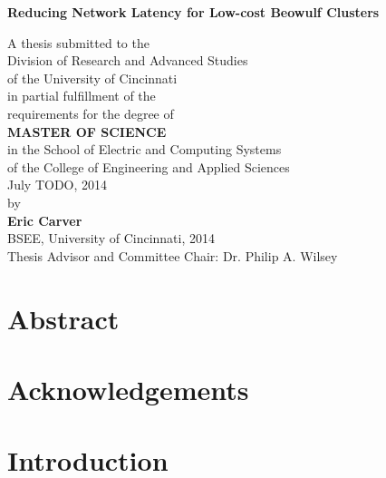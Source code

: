 \documentclass[11pt]{book}
\begin{document}
\thispagestyle{empty}

\doublespacing

\vspace*{0.5in}

\begin{center}
  \LARGE{\textbf{Reducing Network Latency for Low-cost Beowulf Clusters}}

  \vspace*{0.4in}

  {\large A thesis submitted to the\\[0.20in]
    Division of Research and Advanced Studies\\
    of the University of Cincinnati\\[0.20in]
    in partial fulfillment of the\\
    requirements for the degree of\\[0.20in]
    {\bf MASTER OF SCIENCE}\\[0.20in]
    in the School of Electric and Computing Systems\\
    of the College of Engineering and Applied
    Sciences\\[0.20in]
    July TODO, 2014\\[0.20in]
    by\\[0.20in]
    {\bf Eric Carver}\\
    BSEE, University of
    Cincinnati, 2014\\}
  \vspace{0.5in}
  {\large Thesis Advisor and Committee Chair:  Dr. Philip A. Wilsey}
\end{center}

\clearpage

\setcounter{page}{1}
\clearpage

\chapter*{Abstract}


\chapter*{Acknowledgements}

\tableofcontents \markright{ }
\listoffigures \markright{ }
\listoftables \markright{ }

\clearpage
{}
\setcounter{page}{1}

\chapter{Introduction}
\label{introduction}
\end{document}
